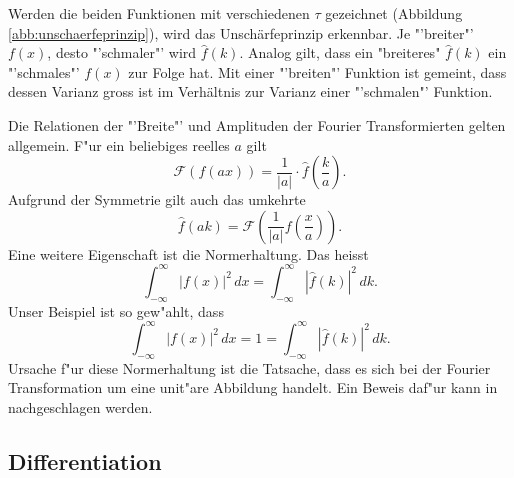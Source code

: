 \begin{refsection}
Werden die beiden Funktionen mit verschiedenen $\tau$ gezeichnet (Abbildung \ref{abb:unschaerfeprinzip}), wird das Unsch\"arfeprinzip erkennbar. Je "'breiter"' $f(x)$, desto "'schmaler"' wird $\hat{f}(k)$. Analog gilt, dass ein "breiteres" $\hat{f}(k)$ ein "'schmales"' $f(x)$ zur Folge hat. Mit einer "'breiten"' Funktion ist gemeint, dass dessen Varianz gross ist im Verhältnis zur Varianz einer "'schmalen"' Funktion.

Die Relationen der "'Breite"' und Amplituden der Fourier Transformierten gelten allgemein. F"ur ein beliebiges reelles $a$ gilt
\begin{equation}
\mathcal{F}(f(ax)) = \frac{1}{|a|}\cdot\hat{f}\left( \frac{k}{a}\right).
\end{equation}
Aufgrund der Symmetrie gilt auch das umkehrte
\begin{equation}
\hat{f}(ak) = \mathcal{F}\left( \frac{1}{|a|}f\left( \frac{x}{a}\right) \right).
\end{equation}
Eine weitere Eigenschaft ist die Normerhaltung. Das heisst
\begin{equation}
\int_{-\infty}^{\infty}|f(x)|^{2} \, dx = \int_{-\infty}^{\infty}|\hat{f}(k)|^{2} \, dk.
\end{equation}
Unser Beispiel ist so gew"ahlt, dass
\begin{equation}
\int_{-\infty}^{\infty}|f(x)|^{2} \, dx = 1 = \int_{-\infty}^{\infty}|\hat{f}(k)|^{2} \, dk.
\end{equation}
Ursache f"ur diese Normerhaltung ist die Tatsache, dass es sich bei der Fourier Transformation um eine unit"are Abbildung handelt.
Ein Beweis daf"ur kann in \cite{skript:QuantenmechanikMotschmann} nachgeschlagen werden.

\subsection{Differentiation}
\label{chapter:ftrans_differentation}


\end{refsection}
